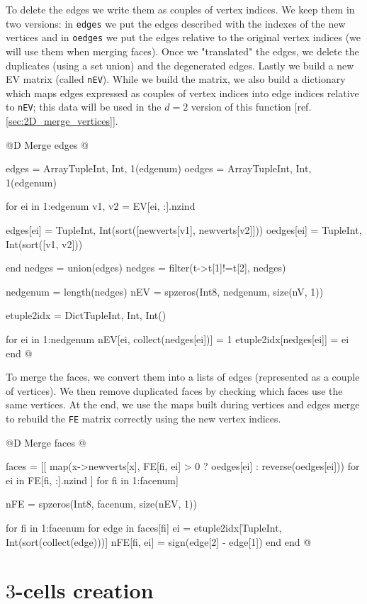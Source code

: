 To delete the edges we write them as couples of vertex
indices. We keep them in two versions: in \texttt{edges}
we put the edges described with the indexes of the new vertices
and in \texttt{oedges} we put the edges relative to the original vertex
indices (we will use them when merging faces). Once we "translated"
the edges, we delete the duplicates (using a set union) and the
degenerated edges. Lastly we build a new EV matrix 
(called \texttt{nEV}). While we
build the matrix, we also build a dictionary which maps edges expressed
as couples of vertex indices into edge indices relative to \texttt{nEV};
this data will be used in the $d=2$ version of this function 
[ref. \ref{sec:2D_merge_vertices}].

@D Merge edges
@{edges = Array{Tuple{Int, Int}, 1}(edgenum)
oedges = Array{Tuple{Int, Int}, 1}(edgenum)

for ei in 1:edgenum
    v1, v2 = EV[ei, :].nzind
    
    edges[ei] = Tuple{Int, Int}(sort([newverts[v1], newverts[v2]]))
    oedges[ei] = Tuple{Int, Int}(sort([v1, v2]))

end
nedges = union(edges)
nedges = filter(t->t[1]!=t[2], nedges)

nedgenum = length(nedges)
nEV = spzeros(Int8, nedgenum, size(nV, 1))

etuple2idx = Dict{Tuple{Int, Int}, Int}()

for ei in 1:nedgenum
    nEV[ei, collect(nedges[ei])] = 1
    etuple2idx[nedges[ei]] = ei
end
@}

To merge the faces, we convert them into a lists of
edges (represented as a couple of vertices). We then remove duplicated faces
by checking which faces use the same vertices. At the end, we use the
maps built during vertices and edges merge to rebuild the \texttt{FE}
matrix correctly using the new vertex indices.

@D Merge faces
@{faces = [[
    map(x->newverts[x], FE[fi, ei] > 0 ? oedges[ei] : reverse(oedges[ei]))
    for ei in FE[fi, :].nzind
] for fi in 1:facenum]

nFE = spzeros(Int8, facenum, size(nEV, 1))

for fi in 1:facenum
    for edge in faces[fi]
        ei = etuple2idx[Tuple{Int, Int}(sort(collect(edge)))]
        nFE[fi, ei] = sign(edge[2] - edge[1])
    end
end
@}




\section{$3$-cells creation}

